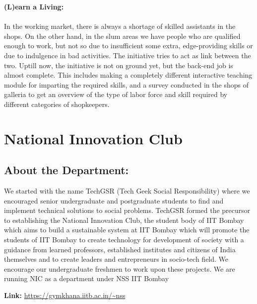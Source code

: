 \noindent \textbf {\Large \linebreak \linebreak \linebreak  (L)earn a Living:}\\ \\In the working market, there is always a shortage of skilled assistants in the shops. On the other hand, in the slum areas we have people who are qualified enough to work, but not so due to insufficient some extra, edge-providing skills or due to indulgence in bad activities. The initiative tries to act as link between the two. Uptill now, the initiative is not on ground yet, but the back-end job is almost complete. This includes making a completely different interactive teaching module for imparting the required skills, and a survey conducted in the shops of galleria to get an overview of the type of labor force and skill required by different categories of shopkeepers.


\chapter*{National Innovation Club}

\section*{ About the Department:}   We started with the name TechGSR (Tech Geek Social Responsibility) where we encouraged senior undergraduate and postgraduate students to find and implement
technical solutions to social problems.
TechGSR formed the precursor to establishing the National Innovation Club, the
student body of IIT Bombay which aims to build a sustainable system at IIT Bombay
which will promote the students of IIT Bombay to create technology for development of
society with a guidance from learned professors, established institutes and citizens of
India themselves and to create leaders and entrepreneurs in socio-tech field. We
encourage our undergraduate freshmen to work upon these projects. We are running
NIC as a department under NSS IIT Bombay

\vspace*{0.5cm}
\noindent \textbf{Link:} \url{https://gymkhana.iitb.ac.in/~nss} \\

